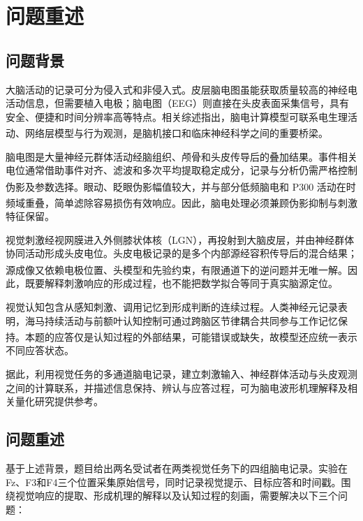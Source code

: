 \documentclass[a4paper]{ctexart}
\numberwithin{figure}{section}       %
\newcommand{\upcite}[1]{\textsuperscript{\cite{#1}}} %
\begin{document}
\vspace{0.5cm}
\newpage

\tableofcontents
\newpage




\section{问题重述}
\subsection{问题背景}
大脑活动的记录可分为侵入式和非侵入式。皮层脑电图虽能获取质量较高的神经电活动信息，但需要植入电极；脑电图（EEG）则直接在头皮表面采集信号，具有安全、便捷和时间分辨率高等特点。相关综述指出，脑电计算模型可联系电生理活动、网络层模型与行为观测，是脑机接口和临床神经科学之间的重要桥梁\upcite{glomb2022computational,michel2019eeg}。

脑电图是大量神经元群体活动经脑组织、颅骨和头皮传导后的叠加结果。事件相关电位通常借助事件对齐、滤波和多次平均提取稳定成分，记录与分析仍需严格控制伪影及参数选择\upcite{picton2000guidelines}。眼动、眨眼伪影幅值较大，并与部分低频脑电和 P300 活动在时频域重叠，简单滤除容易损伤有效响应\upcite{phadikar2021eyeblink,alexander2024affine}。因此，脑电处理必须兼顾伪影抑制与刺激特征保留。

视觉刺激经视网膜进入外侧膝状体核（LGN），再投射到大脑皮层，并由神经群体协同活动形成头皮电位。头皮电极记录的是多个内部源经容积传导后的混合结果；源成像又依赖电极位置、头模型和先验约束，有限通道下的逆问题并无唯一解\upcite{michel2019eeg,kiebel2006dcm}。因此，既要解释刺激响应的形成过程，也不能把数学拟合等同于真实脑源定位。

视觉认知包含从感知刺激、调用记忆到形成判断的连续过程。人类神经元记录表明，海马持续活动与前额叶认知控制可通过跨脑区节律耦合共同参与工作记忆保持\upcite{daume2024control}。本题的应答仅是认知过程的外部结果，可能错误或缺失，故模型还应统一表示不同应答状态。

据此，利用视觉任务的多通道脑电记录，建立刺激输入、神经群体活动与头皮观测之间的计算联系，并描述信息保持、辨认与应答过程，可为脑电波形机理解释及相关量化研究提供参考。

\subsection{问题重述}
基于上述背景，题目给出两名受试者在两类视觉任务下的四组脑电记录。实验在Fz、F3和F4三个位置采集原始信号，同时记录视觉提示、目标应答和时间戳。围绕视觉响应的提取、形成机理的解释以及认知过程的刻画，需要解决以下三个问题：
\end{document}
